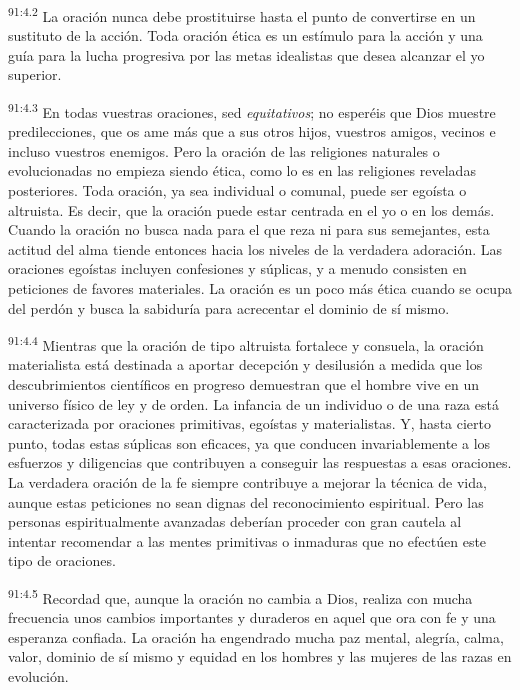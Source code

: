 \documentclass[twoside, 11pt]{book}
\begin{document}
\par
\textsuperscript{91:4.2} La oración nunca debe prostituirse hasta el punto de convertirse en un sustituto de la acción. Toda oración ética es un estímulo para la acción y una guía para la lucha progresiva por las metas idealistas que desea alcanzar el yo superior.

\par
\textsuperscript{91:4.3} En todas vuestras oraciones, sed \textit{equitativos}; no esperéis que Dios muestre predilecciones, que os ame más que a sus otros hijos, vuestros amigos, vecinos e incluso vuestros enemigos. Pero la oración de las religiones naturales o evolucionadas no empieza siendo ética, como lo es en las religiones reveladas posteriores. Toda oración, ya sea individual o comunal, puede ser egoísta o altruista. Es decir, que la oración puede estar centrada en el yo o en los demás. Cuando la oración no busca nada para el que reza ni para sus semejantes, esta actitud del alma tiende entonces hacia los niveles de la verdadera adoración. Las oraciones egoístas incluyen confesiones y súplicas, y a menudo consisten en peticiones de favores materiales. La oración es un poco más ética cuando se ocupa del perdón y busca la sabiduría para acrecentar el dominio de sí mismo.

\par
\textsuperscript{91:4.4} Mientras que la oración de tipo altruista fortalece y consuela, la oración materialista está destinada a aportar decepción y desilusión a medida que los descubrimientos científicos en progreso demuestran que el hombre vive en un universo físico de ley y de orden. La infancia de un individuo o de una raza está caracterizada por oraciones primitivas, egoístas y materialistas. Y, hasta cierto punto, todas estas súplicas son eficaces, ya que conducen invariablemente a los esfuerzos y diligencias que contribuyen a conseguir las respuestas a esas oraciones. La verdadera oración de la fe siempre contribuye a mejorar la técnica de vida, aunque estas peticiones no sean dignas del reconocimiento espiritual. Pero las personas espiritualmente avanzadas deberían proceder con gran cautela al intentar recomendar a las mentes primitivas o inmaduras que no efectúen este tipo de oraciones.

\par
\textsuperscript{91:4.5} Recordad que, aunque la oración no cambia a Dios, realiza con mucha frecuencia unos cambios importantes y duraderos en aquel que ora con fe y una esperanza confiada. La oración ha engendrado mucha paz mental, alegría, calma, valor, dominio de sí mismo y equidad en los hombres y las mujeres de las razas en evolución.
\end{document}
